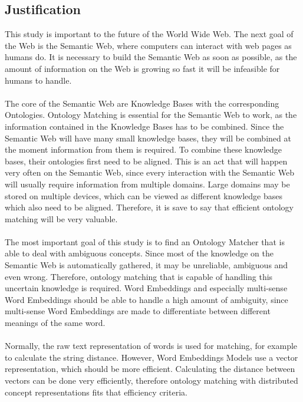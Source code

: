\documentclass{article}
\begin{document}
 \subsection{Justification} 
 This study is important to the future of the World Wide Web. The next goal of the Web is the Semantic Web, where computers can interact with web pages as humans do. It is necessary to build the Semantic Web as soon as possible, as the amount of information on the Web is growing so fast it will be infeasible for humans to handle\cite{overload}.
 \paragraph{}
 The core of the Semantic Web are Knowledge Bases with the corresponding Ontologies. Ontology Matching is essential for the Semantic Web to work, as the information contained in the Knowledge Bases has to be combined. Since the Semantic Web will have many small knowledge bases, they will be combined at the moment information from them is required. To combine these knowledge bases, their ontologies first need to be aligned. This is an act that will happen very often on the Semantic Web, since every interaction with the Semantic Web will usually require information from multiple domains. Large domains may be stored on multiple devices, which can be viewed as different knowledge bases which also need to be aligned. Therefore, it is save to say that efficient ontology matching will be very valuable.
 \paragraph{}
 The most important goal of this study is to find an Ontology Matcher that is able to deal with ambiguous concepts. Since most of the knowledge on the Semantic Web is automatically gathered, it may be unreliable, ambiguous and even wrong. Therefore, ontology matching that is capable of handling this uncertain knowledge is required. Word Embeddings and especially multi-sense Word Embeddings should be able to handle a high amount of ambiguity, since multi-sense Word Embeddings are made to differentiate between different meanings of the same word.
 \paragraph{}
 Normally, the raw text representation of words is used for matching, for example to calculate the string distance. However, Word Embeddings Models use a vector representation, which should be more efficient.
 Calculating the distance between vectors can be done very efficiently, therefore ontology matching with distributed concept representations fits that efficiency criteria. 
\end{document}
